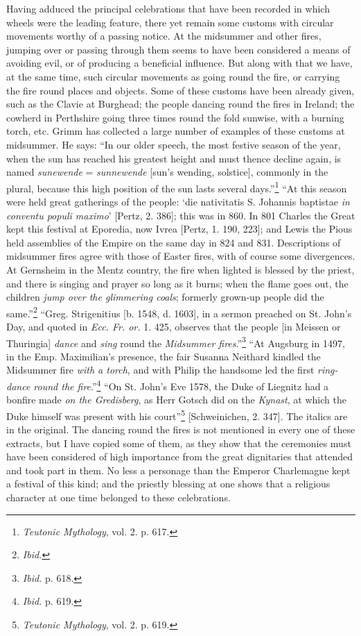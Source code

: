 \documentclass[a4paper, 11pt, oneside, polutonikogreek, english]{article}
\begin{document}
Having adduced the principal celebrations that have been recorded in which wheels were the leading feature, there yet remain some customs with circular movements worthy of a passing notice. At the midsummer and other fires, jumping over or passing through them seems to have been considered a means of avoiding evil, or of producing a beneficial influence. But along with that we have, at the same time, such circular movements as going round the fire, or carrying the fire round places and objects. Some of these customs have been already given, such as the Clavie at Burghead; the people dancing round the fires in Ireland; the cowherd in Perthshire going three times round the fold sunwise, with a burning torch, etc. Grimm has collected a large number of examples of these customs at midsummer. He says: ``In our older speech, the most festive season of the year, when the sun has reached his greatest height and must thence decline again, is named \emph{sunewende} = \emph{sunnewende} [sun's wending, solstice], commonly in the plural, because this high position of the sun lasts several days.''\footnote{\emph{Teutonic Mythology}, vol. 2. p. 617.} ``At this season were held great gatherings of the people: `die nativitatis S. Johannis baptistae \emph{in conventu populi maximo}' [Pertz, 2. 386]; this was in 860. In 801 Charles the Great kept this festival at Eporedia, now Ivrea [Pertz, 1. 190, 223]; and Lewis the Pious held assemblies of the Empire on the same day in 824 and 831. Descriptions of midsummer fires agree with those of Easter fires, with of course some divergences. At Gernsheim in the Mentz country, the fire when lighted is blessed by the priest, and there is singing and prayer so long as it burns; when the flame goes out, the children \emph{jump over the glimmering coals}; formerly grown-up people did the same.''\footnote{\emph{Ibid.}} ``Greg. Strigenitius [b. 1548, d. 1603], in a sermon preached on St. John's Day, and quoted in \emph{Ecc. Fr. or.} 1. 425, observes that the people [in Meissen or Thuringia] \emph{dance} and \emph{sing} round the \emph{Midsummer fires}.''\footnote{\emph{Ibid.} p. 618.} ``At Augsburg in 1497, in the Emp. Maximilian's presence, the fair Susanna Neithard kindled the Midsummer fire \emph{with a torch}, and with Philip the handsome led the first \emph{ring-dance round the fire}.''\footnote{\emph{Ibid.} p. 619.} ``On St. John's Eve 1578, the Duke of Liegnitz had a bonfire made \emph{on the Gredisberg}, as Herr Gotsch did on the \emph{Kynast}, at which the Duke himself was present with his court''\footnote{\emph{Teutonic Mythology}, vol. 2. p. 619.} [Schweinichen, 2. 347]. The italics are in the original. The dancing round the fires is not mentioned in every one of these extracts, but I have copied some of them, as they show that the ceremonies must have been considered of high importance from the great dignitaries that attended and took part in them. No less a personage than the Emperor Charlemagne kept a festival of this kind; and the priestly blessing at one shows that a religious character at one time belonged to these celebrations.
\end{document}
